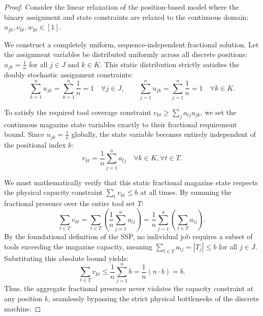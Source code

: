 \documentclass[11pt, a4paper]{book}
\begin{document}
	\begin{proof}
		Consider the linear relaxation of the position-based model where the binary assignment and state constraints are relaxed to the continuous domain: $u_{jk}, v_{kt}, w_{kt} \in [1]$. 
		
		We construct a completely uniform, sequence-independent fractional solution. Let the assignment variables be distributed uniformly across all discrete positions: $u_{jk} = \frac{1}{n}$ for all $j \in J$ and $k \in K$. This static distribution strictly satisfies the doubly stochastic assignment constraints:
		\begin{equation}
			\sum_{k=1}^{n} u_{jk} = \sum_{k=1}^{n} \frac{1}{n} = 1 \quad \forall j \in J, \qquad \sum_{j=1}^{n} u_{jk} = \sum_{j=1}^{n} \frac{1}{n} = 1 \quad \forall k \in K.
		\end{equation}
		
		To satisfy the required tool coverage constraint $v_{kt} \ge \sum_j a_{tj} u_{jk}$, we set the continuous magazine state variables exactly to their fractional requirement bound. Since $u_{jk} = \frac{1}{n}$ globally, the state variable becomes entirely independent of the positional index $k$:
		\begin{equation}
			v_{kt} = \frac{1}{n} \sum_{j=1}^{n} a_{tj} \quad \forall k \in K, \forall t \in T.
		\end{equation}
		
		We must mathematically verify that this static fractional magazine state respects the physical capacity constraint $\sum_t v_{kt} \le b$ at all times. By summing the fractional presence over the entire tool set $T$:
		\begin{equation}
			\sum_{t \in T} v_{kt} = \sum_{t \in T} \left( \frac{1}{n} \sum_{j=1}^{n} a_{tj} \right) = \frac{1}{n} \sum_{j=1}^{n} \left( \sum_{t \in T} a_{tj} \right).
		\end{equation}
		By the foundational definition of the SSP, no individual job requires a subset of tools exceeding the magazine capacity, meaning $\sum_{t \in T} a_{tj} = |T_j| \le b$ for all $j \in J$. Substituting this absolute bound yields:
		\begin{equation}
			\sum_{t \in T} v_{kt} \le \frac{1}{n} \sum_{j=1}^{n} b = \frac{1}{n} (n \cdot b) = b.
		\end{equation}
		Thus, the aggregate fractional presence never violates the capacity constraint at any position $k$, seamlessly bypassing the strict physical bottlenecks of the discrete machine.
		

\end{proof}
\end{document}
